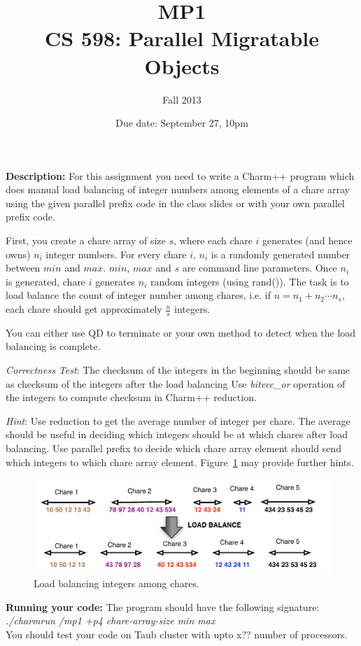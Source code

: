 \documentclass{article}
\title{MP1 \\ CS 598: Parallel Migratable Objects}
\author{Fall 2013}
\date{Due date: September 27, 10pm}
\begin{document}
\maketitle

\textbf{Description:} 
For this assignment you need to write a Charm++ program which does manual load
balancing of integer numbers among elements of a chare array using the 
given parallel prefix code in the class slides or with your own parallel 
prefix code. 

First, you create a chare array of size $s$, where each chare $i$ generates 
(and hence owns) $n_i$ integer numbers. For every chare $i$, $n_i$ is a 
randomly generated number between $min$ and $max$. 
$min$, $max$ and $s$ are command line parameters. 
Once $n_i$ is generated, chare $i$ generates $n_i$ random 
integers (using rand()). The task is to load balance the count
of integer number among chares, i.e. if $n = n_1 + n_2 \cdots n_s$,
each chare should get approximately $\frac{n}{s}$ integers.

You can either use QD to terminate or your own method to detect when
the load balancing is complete.

\emph{Correctness Test}: The checksum of the integers in the beginning
should be same as checksum of the integers after the load balancing
Use \emph{bitvec\_or} operation of the integers to compute checksum in Charm++
reduction.

\emph{Hint}: Use reduction to get the average number of integer per chare. 
The average should be useful in deciding which integers should be at which chares
after load balancing. Use parallel prefix to decide which chare array element 
should send which integers to which chare array element. Figure~\ref{prefix}
may provide further hints.

\begin{figure}
\centering
\includegraphics[width=\textwidth]{prob1.pdf}
\caption{Load balancing integers among chares.}
\label{prefix}
\end{figure}

\textbf{Running your code:}
The program should have the following signature:
\textit{./charmrun /mp1 +p4 chare-array-size min max} \\
You should test your code on Taub cluster with upto x?? number of processors.
\end{document}
